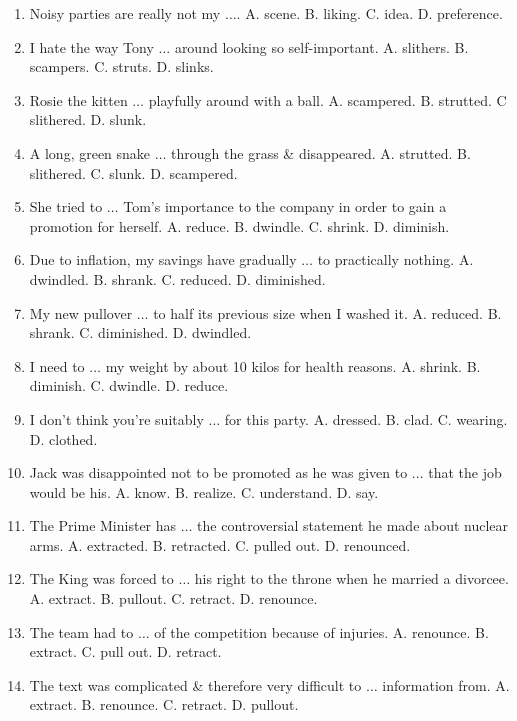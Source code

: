 \documentclass{article}
\numberwithin{equation}{section}
\begin{document}
\begin{enumerate}[leftmargin=8mm]
	\item Noisy parties are really not my $\ldots$. {\sf A.} scene. {\sf B.} liking. {\sf C.} idea. {\sf D.} preference.
	\item I hate the way Tony $\ldots$ around looking so self-important. {\sf A.} slithers. {\sf B.} scampers. {\sf C.} struts. {\sf D.} slinks.
	\item Rosie the kitten $\ldots$ playfully around with a ball. {\sf A.} scampered. {\sf B.} strutted. C slithered. {\sf D.} slunk.
	\item A long, green snake $\ldots$ through the grass \& disappeared. {\sf A.} strutted. {\sf B.} slithered. {\sf C.} slunk. {\sf D.} scampered.
	\item She tried to $\ldots$ Tom's importance to the company in order to gain a promotion for herself. {\sf A.} reduce. {\sf B.} dwindle. {\sf C.} shrink. {\sf D.} diminish.
	\item Due to inflation, my savings have gradually $\ldots$ to practically nothing. {\sf A.} dwindled. {\sf B.} shrank. {\sf C.} reduced. {\sf D.} diminished.
	\item My new pullover $\ldots$ to half its previous size when I washed it. {\sf A.} reduced. {\sf B.} shrank. {\sf C.} diminished. {\sf D.} dwindled.
	\item I need to $\ldots$ my weight by about 10 kilos for health reasons. {\sf A.} shrink. {\sf B.} diminish. {\sf C.} dwindle. {\sf D.} reduce.
	\item I don't think you're suitably $\ldots$ for this party. {\sf A.} dressed. {\sf B.} clad. {\sf C.} wearing. {\sf D.} clothed.
	\item Jack was disappointed not to be promoted as he was given to $\ldots$ that the job would be his. {\sf A.} know. {\sf B.} realize. {\sf C.} understand. {\sf D.} say.
	\item The Prime Minister has $\ldots$ the controversial statement he made about nuclear arms. {\sf A.} extracted. {\sf B.} retracted. {\sf C.} pulled out. {\sf D.} renounced.
	\item The King was forced to $\ldots$ his right to the throne when he married a divorcee. {\sf A.} extract. {\sf B.} pullout. {\sf C.} retract. {\sf D.} renounce.
	\item The team had to $\ldots$ of the competition because of injuries. {\sf A.} renounce. {\sf B.} extract. {\sf C.} pull out. {\sf D.} retract.
	\item The text was complicated \& therefore very difficult to $\ldots$ information from. {\sf A.} extract. {\sf B.} renounce. {\sf C.} retract. {\sf D.} pullout.

\end{enumerate}
\end{document}
